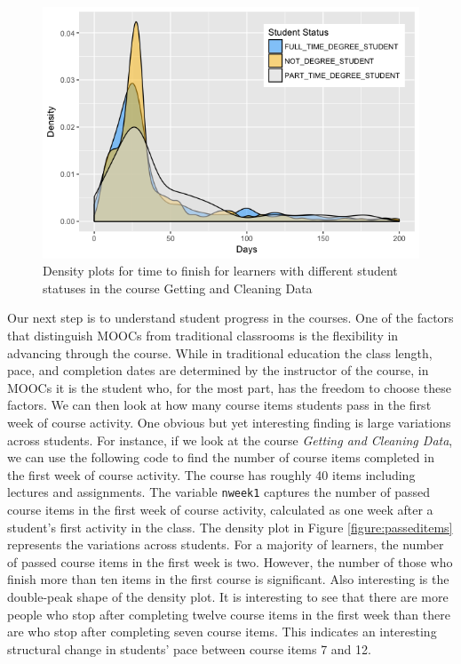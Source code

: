 \begin{figure}[htbp]
    \centering
    \includegraphics[scale=0.5]{stustatus}
    \caption{Density plots for time to finish for learners with different student statuses in the course Getting and Cleaning Data}
    \label{figure:stustatus}
\end{figure}

Our next step is to understand student progress in the courses. One of
the factors that distinguish MOOCs from traditional classrooms is the
flexibility in advancing through the course. While in traditional
education the class length, pace, and completion dates are determined by
the instructor of the course, in MOOCs it is the student who, for the
most part, has the freedom to choose these factors. We can then look at
how many course items students pass in the first week of course
activity. One obvious but yet interesting finding is large variations
across students. For instance, if we look at the course \emph{Getting
and Cleaning Data}, we can use the following code to find the number of
course items completed in the first week of course activity. The course
has roughly 40 items including lectures and assignments. The variable
\texttt{nweek1} captures the number of passed course items in the first
week of course activity, calculated as one week after a student's first
activity in the class. The density plot in Figure
\ref{figure:passeditems} represents the variations across students. For
a majority of learners, the number of passed course items in the first
week is two. However, the number of those who finish more than ten items
in the first course is significant. Also interesting is the double-peak
shape of the density plot. It is interesting to see that there are more
people who stop after completing twelve course items in the first week
than there are who stop after completing seven course items. This
indicates an interesting structural change in students' pace between
course items 7 and 12.


